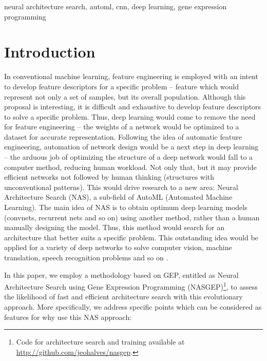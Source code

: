 \documentclass[conference]{IEEEtran}
\begin{document}
	\begin{IEEEkeywords}
		neural architecture search, automl, cnn, deep learning, gene expression programming
	\end{IEEEkeywords}
	
	\section{Introduction}
	
	In conventional machine learning, feature engineering is employed with an intent to develop feature descriptors for a specific problem -- feature which would represent not only a set of samples, but its overall population.
	Although this proposal is interesting, it is difficult and exhaustive to develop feature descriptors to solve a specific problem.
	Thus, deep learning would come to remove the need for feature engineering -- the weights of a network would be optimized to a dataset for accurate representation.
	Following the idea of automatic feature engineering, automation of network design would be a next step in deep learning -- the arduous job of optimizing the structure of a deep network would fall to a computer method, reducing human workload.
	Not only that, but it may provide efficient networks not followed by human thinking (structures with unconventional patterns).
	This would drive research to a new area: Neural Architecture Search (NAS), a sub-field of AutoML (Automated Machine Learning).
	The main idea of NAS is to obtain optimum deep learning models (convnets, recurrent nets and so on) using another method, rather than a human manually designing the model.
	Thus, this method would search for an architecture that better suits a specific problem.
	This outstanding idea would be applied for a variety of deep networks to solve computer vision, machine translation, speech recognition problems and so on \cite{elsken2018neural}.
	
	In this paper, we employ a methodology based on GEP, entitled as Neural Architecture Search using Gene Expression Programming (NASGEP)\footnote{Code for architecture search and training available at \url{http://github.com/jeohalves/nasgep}.}, to assess the likelihood of fast and efficient architecture search with this evolutionary approach.    
	More specifically, we address specific points which can be considered as features for why use this NAS approach:
	
\end{document}

